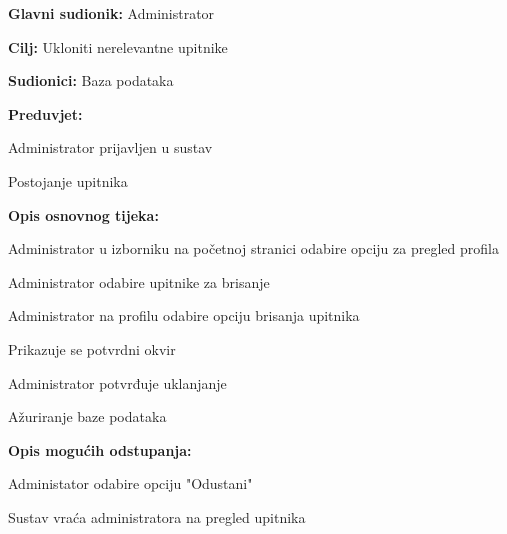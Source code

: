 					\noindent {}
					\begin{packed_item}
	
						\item \textbf{Glavni sudionik:} Administrator
						\item \textbf{Cilj:} Ukloniti nerelevantne upitnike
						\item \textbf{Sudionici:} Baza podataka
						\item \textbf{Preduvjet:} 
						\begin{packed_item}
							\item Administrator prijavljen u sustav
							\item Postojanje upitnika
						\end{packed_item}

						\item \textbf{Opis osnovnog tijeka:}
						
						\item[] \begin{packed_enum}
	
							\item Administrator u izborniku na početnoj stranici odabire opciju za pregled profila
							\item Administrator odabire upitnike za brisanje
							\item Administrator na profilu odabire opciju brisanja upitnika
							\item Prikazuje se potvrdni okvir
							\item Administrator potvrđuje uklanjanje
							\item Ažuriranje baze podataka
						\end{packed_enum}
							
						\item \textbf{Opis mogućih odstupanja:}
					
							\item[] \begin{packed_item}
		
								\item[5.a] Administator odabire opciju "Odustani"
								\item[] \begin{packed_enum}
									
									\item Sustav vraća administratora na pregled upitnika
									
								\end{packed_enum}
							
							\end{packed_item}

					\end{packed_item}

